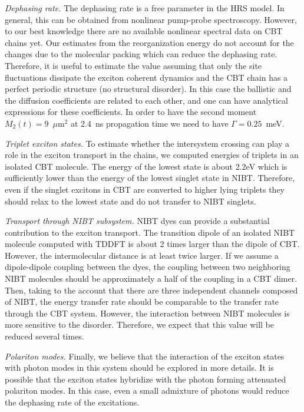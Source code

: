 \documentclass[journal=jacs,manuscript=article]{achemso}
\begin{document}
\textit{Dephasing rate.} The dephasing rate is a free parameter in the HRS model. In general, this can be obtained from nonlinear pump-probe spectroscopy.\cite{} However, to our best knowledge there are no available nonlinear spectral data on CBT chains yet. Our estimates from the reorganization energy do not account for the changes due to the molecular packing which can reduce the dephasing rate. Therefore, it is useful to estimate the value assuming that only the site fluctuations dissipate the exciton coherent dynamics and the CBT chain has a perfect periodic structure (no structural disorder). In this case the ballistic and the diffusion coefficients are related to each other, and one can have analytical expressions for these coefficients.\cite{Reineker_ZfP1973} In order to have the second moment $M_2(t)=9$~$\mu$m$^2$ at 2.4~ns propagation time we need to have $\Gamma =0.25$~meV.

\textit{Triplet exciton states.} To estimate whether the intersystem crossing can play a role in the exciton transport in the chains, we computed energies of triplets in an isolated CBT molecule. The energy of the lowest state is about $2.2$eV which is sufficiently lower than the energy of the lowest singlet state in NIBT. Therefore, even if the singlet excitons in CBT are converted to higher lying triplets they should relax to the lowest state and do not transfer to NIBT singlets.

\textit{Transport through NIBT subsystem.} NIBT dyes can provide a substantial contribution to the exciton transport. The transition dipole of an isolated NIBT molecule computed with TDDFT is about 2 times larger than the dipole of CBT. However, the intermolecular distance is at least twice larger. If we assume a dipole-dipole coupling between the dyes, the coupling between two neighboring NIBT molecules should be approximately a half of the coupling in a CBT dimer. Then, taking to the account that there are three independent channels composed of NIBT, the energy transfer rate should be comparable to the transfer rate through the CBT system. However, the interaction between NIBT molecules is more sensitive to the disorder. Therefore, we expect that this value will be reduced several times.

\textit{Polariton modes.} Finally, we believe that the interaction of the exciton states with photon modes in this system should be explored in more details. It is possible that the exciton states hybridize with the photon forming attenuated polariton modes. In this case, even a small admixture of photons would reduce the dephasing rate of the excitations.
\end{document}
